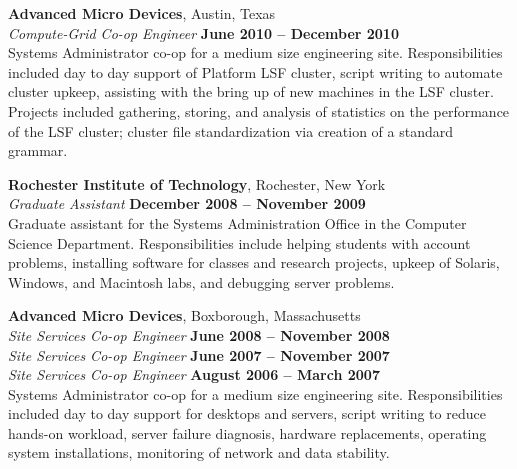 \documentclass[margin,line]{resume}
\begin{document}
\begin{resume}
    \textbf{Advanced Micro Devices}, Austin, Texas \vspace{2mm}\\\vspace{1mm}%
    \textsl{Compute-Grid Co-op Engineer} \hfill \textbf{June 2010 -- December 2010}\\\vspace{0.5mm}%
    Systems Administrator co-op for a medium size engineering site. Responsibilities included day to day
    support of Platform LSF cluster, script writing to automate cluster upkeep, assisting with the bring up
    of new machines in the LSF cluster. Projects included gathering, storing, and analysis of statistics on
    the performance of the LSF cluster; cluster file standardization via creation of a standard grammar.

    \textbf{Rochester Institute of Technology}, Rochester, New York \vspace{2mm}\\\vspace{1mm}%
    \textsl{Graduate Assistant} \hfill \textbf{December 2008 -- November 2009}\\
    Graduate assistant for the Systems Administration Office in the Computer
    Science Department. Responsibilities include helping students with account
    problems, installing software for classes and research projects, upkeep
    of Solaris, Windows, and Macintosh labs, and debugging server problems.

    \textbf{Advanced Micro Devices}, Boxborough, Massachusetts \vspace{2mm}\\\vspace{1mm}%
    \textsl{Site Services Co-op Engineer} \hfill \textbf{June 2008 -- November 2008}\\\vspace{0.5mm}%
    \textsl{Site Services Co-op Engineer} \hfill \textbf{June 2007 -- November 2007}\\\vspace{0.5mm}%
    \textsl{Site Services Co-op Engineer} \hfill \textbf{August 2006 -- March 2007}\\\vspace{0.5mm}%
    Systems Administrator co-op for a medium size engineering site. Responsibilities included day to day 
    support for desktops and servers, script writing to reduce hands-on workload, server failure diagnosis,
    hardware replacements, operating system installations, monitoring of network and data stability. 


\end{resume}
\end{document}
